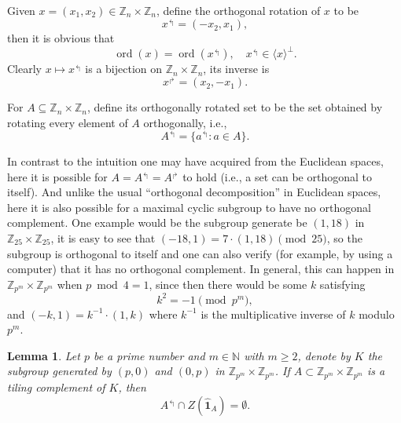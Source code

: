 \documentclass[A4, 11pt]{article}
\DeclareMathOperator{\ord}{ord}
\newcommand{\bra}[1]{\langle#1\rangle}
\newcommand{\G}[1]{\mathbb Z_{#1}\times\mathbb Z_{#1}}
\newcommand{\F}[1]{\widehat{\mathbf 1}_{#1}}
\newcommand{\Z}[1]{Z(\F{#1})}
\newtheorem{Lm}{Lemma}
\begin{document}
Given $x=(x_1,x_2)\in\G{n}$, define the orthogonal rotation of $x$ to be
$$x^{\Lsh}=(-x_2,x_1),$$
then it is obvious that
$$\ord(x)=\ord(x^{\Lsh}), \quad x^{\Lsh}\in\bra{x}^{\perp}.$$
Clearly $x\mapsto x^{\Lsh}$ is a bijection on $\G{n}$, its inverse is 
$$x^{\Rsh}=(x_2,-x_1).$$

For $A\subseteq\G{n}$, define its orthogonally rotated set to be the set obtained by rotating every element of $A$ orthogonally, i.e.,
$$A^{\Lsh}=\{a^{\Lsh}: a\in A\}.$$

In contrast to the intuition one may have acquired from the Euclidean spaces, here it is possible for $A=A^{\Lsh}=A^{\Rsh}$ to hold (i.e., a set can be orthogonal to itself). And unlike the usual ``orthogonal decomposition'' in Euclidean spaces, here it is also possible for a maximal cyclic subgroup to have no orthogonal complement. One example would be the subgroup generate be $(1,18)$ in $\G{25}$, it is easy to see that $(-18,1)=7\cdot (1,18) \pmod{25}$, so the subgroup is orthogonal to itself and one can also verify (for example, by using a computer) that it has no orthogonal complement. In general, this can happen in $\G{p^m}$ when $p \bmod 4=1$, since then there would be some $k$ satisfying 
$$k^2=-1 \pmod{p^m},$$
and $(-k,1)=k^{-1}\cdot (1,k)$ where $k^{-1}$ is the multiplicative inverse of $k$ modulo $p^m$.

\begin{Lm} \label{LmSelf}
Let $p$ be a prime number and $m\in\mathbb N$ with $m\ge 2$, denote by $K$ the subgroup generated by $(p,0)$ and $(0,p)$ in $\G{p^m}$. If $A\subset\G{p^m}$ is a tiling complement of $K$, then 
$$A^{\Lsh}\cap \Z{A}=\emptyset.$$
\end{Lm}
\end{document}
